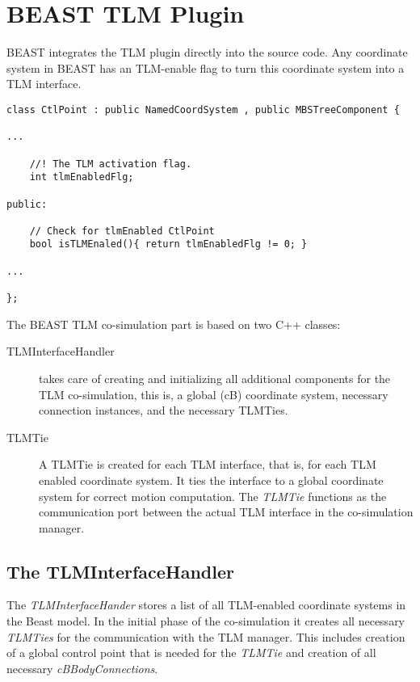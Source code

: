 \chapter{BEAST TLM Plugin}

BEAST integrates the TLM plugin directly into the source code. 
Any coordinate system in BEAST has an TLM-enable flag to turn this coordinate system into a TLM interface.

{\scriptsize
\begin{verbatim}
class CtlPoint : public NamedCoordSystem , public MBSTreeComponent {

...

    //! The TLM activation flag.
    int tlmEnabledFlg;

public:

    // Check for tlmEnabled CtlPoint
    bool isTLMEnaled(){ return tlmEnabledFlg != 0; }

...

};
\end{verbatim}
}

The BEAST TLM co-simulation part is based on two C++ classes:
\begin{description}
\item[TLMInterfaceHandler] takes care of creating and initializing all additional components for the TLM co-simulation, this is, a global (cB) coordinate system, necessary connection instances, and the necessary TLMTies.
\item[TLMTie] A TLMTie is created for each TLM interface, that is, for each TLM enabled coordinate system. 
It ties the interface to a global coordinate system for correct motion computation. 
The {\em TLMTie} functions as the communication port between the actual TLM interface in the co-simulation manager.
\end{description}


\section{The TLMInterfaceHandler}
The {\em TLMInterfaceHander} stores a list of all TLM-enabled coordinate systems in the Beast model. 
In the initial phase of the co-simulation it creates all necessary {\em TLMTies} for the communication with the TLM manager. 
This includes creation of a global control point that is needed for the {\em TLMTie} and creation of all necessary {\em cBBodyConnections}.

